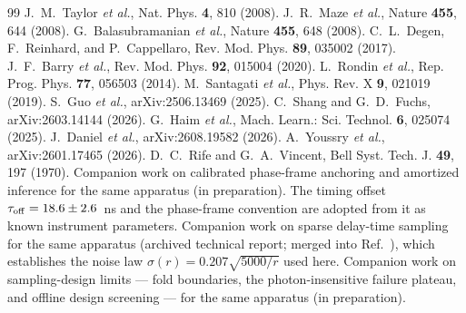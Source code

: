 \documentclass[aps,pra,twocolumn,superscriptaddress,nofootinbib]{revtex4-2}
\begin{document}
\begin{thebibliography}{99}
 J.~M.~Taylor \emph{et al.}, Nat. Phys. \textbf{4}, 810 (2008).
 J.~R.~Maze \emph{et al.}, Nature \textbf{455}, 644 (2008).
 G.~Balasubramanian \emph{et al.}, Nature \textbf{455}, 648 (2008).
 C.~L.~Degen, F.~Reinhard, and P.~Cappellaro, Rev. Mod. Phys. \textbf{89}, 035002 (2017).
 J.~F.~Barry \emph{et al.}, Rev. Mod. Phys. \textbf{92}, 015004 (2020).
 L.~Rondin \emph{et al.}, Rep. Prog. Phys. \textbf{77}, 056503 (2014).
 M.~Santagati \emph{et al.}, Phys. Rev. X \textbf{9}, 021019 (2019).
 S.~Guo \emph{et al.}, arXiv:2506.13469 (2025).
 C.~Shang and G.~D.~Fuchs, arXiv:2603.14144 (2026).
 G.~Haim \emph{et al.}, Mach. Learn.: Sci. Technol. \textbf{6}, 025074 (2025).
 J.~Daniel \emph{et al.}, arXiv:2608.19582 (2026).
 A.~Youssry \emph{et al.}, arXiv:2601.17465 (2026).
 D.~C.~Rife and G.~A.~Vincent, Bell Syst. Tech. J. \textbf{49}, 197 (1970).
 Companion work on calibrated phase-frame anchoring and amortized
inference for the same apparatus (in preparation). The timing offset
$\tau_{\rm off}=18.6\pm2.6$~ns and the phase-frame convention are adopted
from it as known instrument parameters.
 Companion work on sparse delay-time sampling for the same apparatus
(archived technical report; merged into Ref.~\cite{L4companion}), which establishes the
noise law $\sigma(r)=0.207\sqrt{5000/r}$ used here.
 Companion work on sampling-design limits --- fold boundaries, the
photon-insensitive failure plateau, and offline design screening --- for the same apparatus
(in preparation).
\end{thebibliography}
\end{document}
